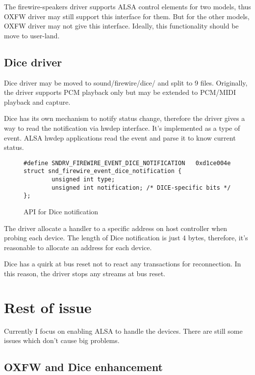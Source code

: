 \documentclass[onecolumn]{article}
\begin{document}
The firewire-speakers driver supports ALSA control elements for two models, thus OXFW driver may still support this interface for them. But for the other models, OXFW driver may not give this interface. Ideally, this functionality should be move to user-land.

\subsection{Dice driver}

Dice driver may be moved to sound/firewire/dice/ and split to 9 files. Originally, the driver supports PCM playback only but may be extended to PCM/MIDI playback and capture.

Dice has its own mechanism to notify status change, therefore the driver gives a way to read the notification via hwdep interface. It's implemented as a type of event. ALSA hwdep applications read the event and parse it to know current status.

\begin{figure}[H]
\small
\begin{verbatim}
#define SNDRV_FIREWIRE_EVENT_DICE_NOTIFICATION   0xd1ce004e
struct snd_firewire_event_dice_notification {
        unsigned int type;
        unsigned int notification; /* DICE-specific bits */
};
\end{verbatim}
\caption{API for Dice notification}
\label{uapi-dice-notification}
\end{figure}

The driver allocate a handler to a specific address on host controller when probing each device. The length of Dice notification is just 4 bytes, therefore, it's reasonable to allocate an address for each device.

Dice has a quirk at bus reset not to react any transactions for reconnection. In this reason, the driver stops any streams at bus reset.

\section{Rest of issue}

Currently I focus on enabling ALSA to handle the devices. There are still some issues which don't cause big problems.

\subsection{OXFW and Dice enhancement}
\end{document}
